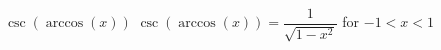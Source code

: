  {$\csc \left( \arccos \left( x \right) \right)$ }
{ $\csc \left( \arccos \left( x \right) \right) = \dfrac{1}{\sqrt{1 - x^{2}}}$ for $-1 < x < 1$}
